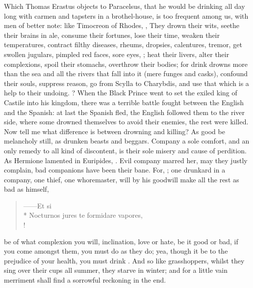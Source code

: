 {Which Thomas Erastus objects to Paracelsus, that he would be drinking all day long with carmen and tapsters in a brothel-house, is too frequent among us, with men of better note: like Timocreon of Rhodes, , \etc{} They drown their wits, seethe their brains in ale, consume their fortunes, lose their time, weaken their temperatures, contract filthy diseases, rheums, dropsies, calentures, tremor, get swollen jugulars, pimpled red faces, sore eyes, \etc{}; heat their livers, alter their complexions, spoil their stomachs, overthrow their bodies; for drink drowns more than the sea and all the rivers that fall into it (mere funges and casks), confound their souls, suppress reason, go from Scylla to Charybdis, and use that which is a help to their undoing. ? When the Black Prince went to set the exiled king of Castile into his kingdom, there was a terrible battle fought between the English and the Spanish: at last the Spanish fled, the English followed them to the river side, where some drowned themselves to avoid their enemies, the rest were killed. Now tell me what difference is between drowning and killing? As good be melancholy still, as drunken beasts and beggars. Company a sole comfort, and an only remedy to all kind of discontent, is their sole misery and cause of perdition. As Hermione lamented in Euripides, . Evil company marred her, may they justly complain, bad companions have been their bane. For, ; one drunkard in a company, one thief, one whoremaster, will by his goodwill make all the rest as bad as himself,

\begin{latin}
\begin{verse}%
------Et si\\*
Nocturnos jures te formidare vapores,\\!
\end{verse}%
\end{latin}

be of what complexion you will, inclination, love or hate, be it good or bad, if you come amongst them, you must do as they do; yea, though it be to the prejudice of your health, you must drink . And so like grasshoppers, whilst they sing over their cups all summer, they starve in winter; and for a little vain merriment shall find a sorrowful reckoning in the end.

}
